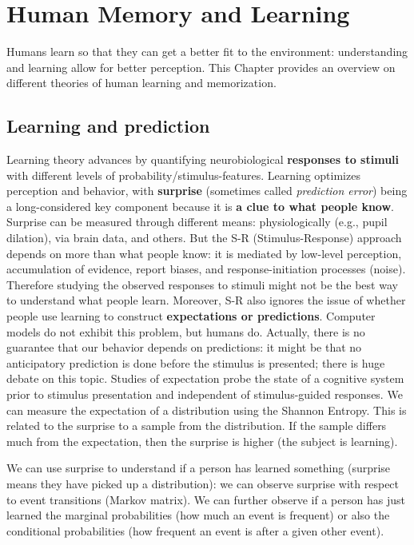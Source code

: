 \chapter{Human Memory and Learning}
\label{chap:modeling_memory}

Humans learn so that they can get a better fit to the environment: understanding and learning allow for better perception. This Chapter provides an overview on different theories of human learning and memorization. 

\section{Learning and prediction}
Learning theory  advances by quantifying neurobiological \textbf{responses to stimuli} with different levels of probability/stimulus-features. Learning optimizes perception and behavior, with \textbf{surprise} (sometimes called \textit{prediction error}) being a long-considered key component because it is \textbf{a clue to what people know}. Surprise can be measured through different means: physiologically (e.g., pupil dilation), via brain data, and others.
But the S-R (Stimulus-Response) approach depends on more than what people know: it is mediated by low-level perception, accumulation of evidence, report biases, and response-initiation processes (noise). Therefore studying the observed responses to stimuli might not be the best way to understand what people learn.
Moreover, S-R also ignores the issue of whether people use learning to construct \textbf{expectations or predictions}. Computer models do not exhibit this problem, but humans do. Actually, there is no guarantee that our behavior depends on predictions: it might be that no anticipatory prediction is done before the stimulus is presented; there is huge debate on this topic.
Studies of expectation probe the state of a cognitive system prior to stimulus presentation and independent of stimulus-guided responses. We can measure the expectation of a distribution using the Shannon Entropy. This is related to the surprise to a sample from the distribution. If the sample differs much from the expectation, then the surprise is higher (the subject is learning).

We can use surprise to understand if a person has learned something (surprise means they have picked up a distribution): we can observe surprise with respect to event transitions (Markov matrix). We can further observe if a person has just learned the marginal probabilities (how much an event is frequent) or also the conditional probabilities (how frequent an event is after a given other event).

